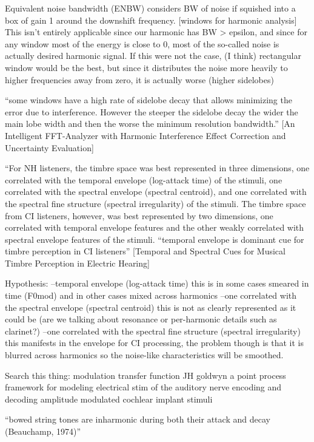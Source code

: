 \documentclass [11pt, proquest] {uwthesis}[2015/03/03]
\begin{document}
Equivalent noise bandwidth (ENBW) considers BW of noise if squished into a box of gain 1 around the downshift frequency.  [windows for harmonic analysis] This isn't entirely applicable since our harmonic has BW > epsilon, and since for any window most of the energy is close to 0, most of the so-called noise is actually desired harmonic signal.  If this were not the case, (I think) rectangular window would be the best, but since it distributes the noise more heavily to higher frequencies away from zero, it is actually worse (higher sidelobes)

``some windows have a high rate of sidelobe decay that allows minimizing the error due to interference. However the steeper the sidelobe decay
the wider the main lobe width and then the worse the minimum resolution bandwidth.'' [An Intelligent FFT-Analyzer with Harmonic Interference Effect Correction and Uncertainty Evaluation]

``For NH listeners, the timbre space was best represented in three dimensions, one correlated with the temporal envelope (log-attack time) of the stimuli, one correlated with the spectral envelope (spectral centroid), and one correlated with the spectral fine structure (spectral irregularity) of the stimuli. The timbre space from CI listeners, however, was best represented by two dimensions, one correlated with temporal envelope features and the other weakly correlated with spectral envelope features of the stimuli. 
``temporal envelope is dominant cue for timbre perception in CI listeners''
[Temporal and Spectral Cues for Musical Timbre
Perception in Electric Hearing]

Hypothesis:
--temporal envelope (log-attack time)
this is in some cases smeared in time (F0mod) and in other cases mixed across harmonics
--one correlated with the spectral envelope (spectral centroid)
this is not as clearly represented as it could be (are we talking about resonance or per-harmonic details such as clarinet?)
--one correlated with the spectral fine structure (spectral irregularity)
this manifests in the envelope for CI processing, the problem though is that it is blurred across harmonics so the noise-like characteristics will be smoothed.

Search this thing:
modulation transfer function
JH goldwyn
a point process framework for modeling electrical stim of the auditory nerve
encoding and decoding amplitude modulated cochlear implant stimuli

``bowed string tones are inharmonic during both their attack and decay (Beauchamp, 1974)''
\end{document}
